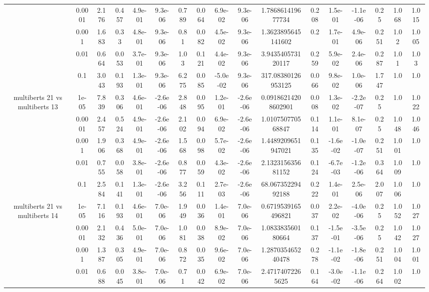 \begin{tabular}{|c|c|c|c|c|c|c|c|c|c|c|c|c|c|c|c|c|}
 & 0.0001 & 2.176 & 0.457 & 4.9e-01 & 9.3e-06 & 0.789 & 0.064 & 6.9e-02 & 9.3e-06 & 1.786861419677734 & 0.208 & 1.5e-01 & -1.1e-06 & 0.25 & 1.068 & 1.015 \\
 & 0.001 & 1.683 & 0.33 & 4.8e-01 & 9.3e-06 & 0.81 & 0.082 & 4.5e-02 & 9.3e-06 & 1.3623895645141602 & 0.2 & 1.7e-01 & 4.9e-06 & 0.251 & 1.02 & 1.005 \\
 & 0.01 & 0.664 & 0.053 & 3.7e-01 & 9.3e-06 & 1.03 & 0.121 & 4.4e-02 & 9.3e-06 & 3.943540573120117 & 0.259 & 5.9e-02 & 2.4e-06 & 0.287 & 1.01 & 1.03 \\
 & 0.1 & 3.043 & 0.193 & 1.3e-01 & 9.3e-06 & 6.275 & 0.085 & -5.0e-02 & 9.3e-06 & 317.08380126953125 & 0.066 & 9.8e-02 & 1.0e-06 & 1.747 & 1.0 & 1.0 \\
\hline
\multirow{5}{*}{multiberts 21 vs multiberts 13} & 1e-05 & 7.839 & 0.306 & 4.6e-01 & -2.6e-06 & 2.848 & 0.095 & 1.2e-01 & -2.6e-06 & 0.09186214208602901 & 0.008 & 1.3e-02 & -2.2e-07 & 0.25 & 1.0 & 1.022 \\
 & 0.0001 & 2.457 & 0.524 & 4.9e-01 & -2.6e-06 & 2.102 & 0.094 & 6.9e-02 & -2.6e-06 & 1.010750770568847 & 0.114 & 1.1e-01 & 8.1e-07 & 0.25 & 1.048 & 1.046 \\
 & 0.001 & 1.906 & 0.368 & 4.9e-01 & -2.6e-06 & 1.568 & 0.098 & 5.7e-02 & -2.6e-06 & 1.4489209651947021 & 0.135 & -1.6e-02 & -1.0e-07 & 0.251 & 1.001 & 1.0 \\
 & 0.01 & 0.755 & 0.058 & 3.8e-01 & -2.6e-06 & 0.877 & 0.059 & 4.3e-02 & -2.6e-06 & 2.132315635681152 & 0.124 & -6.7e-03 & -1.2e-06 & 0.364 & 1.009 & 1.0 \\
 & 0.1 & 2.584 & 0.141 & 1.3e-01 & -2.6e-06 & 3.256 & 0.111 & 2.7e-03 & -2.6e-06 & 68.06735229492188 & 0.222 & 1.4e-01 & 2.5e-06 & 2.007 & 1.006 & 1.0 \\
\hline
\multirow{5}{*}{multiberts 21 vs multiberts 14} & 1e-05 & 7.116 & 0.193 & 4.6e-01 & 7.0e-06 & 1.949 & 0.036 & 1.4e-01 & 7.0e-06 & 0.6719539165496821 & 0.037 & 2.2e-02 & -4.0e-06 & 0.25 & 1.052 & 1.027 \\
 & 0.0001 & 2.132 & 0.436 & 5.0e-01 & 7.0e-06 & 1.081 & 0.038 & 8.9e-02 & 7.0e-06 & 1.083383560180664 & 0.137 & -1.5e-01 & -3.5e-06 & 0.25 & 1.042 & 1.027 \\
 & 0.001 & 1.387 & 0.305 & 4.9e-01 & 7.0e-06 & 0.872 & 0.035 & 9.6e-02 & 7.0e-06 & 1.287035465240478 & 0.278 & -1.1e-02 & -1.8e-06 & 0.251 & 1.004 & 1.001 \\
 & 0.01 & 0.688 & 0.045 & 3.8e-01 & 7.0e-06 & 0.71 & 0.042 & 6.9e-02 & 7.0e-06 & 2.47174072265625 & 0.164 & -3.0e-02 & -1.1e-06 & 0.264 & 1.002 & 1.0 \\

\end{tabular}
